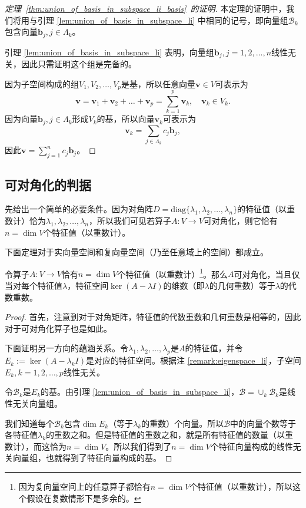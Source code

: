 \begin{proof}[定理~\ref{thm:union_of_basis_in_subspace_li_basis}~的证明]
    本定理的证明中，我们将用与引理 \ref{lem:union_of_basis_in_subspace_li} 中相同的记号，即向量组$\mathcal{B}_k$包含向量$\mathbf{b}_{j},j\in\Lambda_{k}$。

    引理 \ref{lem:union_of_basis_in_subspace_li} 表明，向量组$\mathbf{b}_{j},j=1,2,\dots,n$线性无关，因此只需证明这个组是完备的。

    因为子空间构成的组$V_1,V_2,\ldots,V_p$是基，所以任意向量$\mathbf{v}\in V$可表示为\[\mathbf{v}=\mathbf{v}_1+\mathbf{v}_2+\ldots+\mathbf{v}_p=\sum_{k=1}^p\mathbf{v}_k,\quad\mathbf{v}_k\in V_k.\]
    因为向量$\mathbf{b}_{j},j\in\Lambda_{k}$形成$V_k$的基，所以向量$\mathbf{v}_k$可表示为\[\mathbf{v}_k=\sum_{j\in\Lambda_k}c_j\mathbf{b}_j,\]
    因此$\mathbf{v}=\sum_{j=1}^nc_j\mathbf{b}_j$。
\end{proof}

\subsection{可对角化的判据}

先给出一个简单的必要条件。因为对角阵$D=\mathrm{diag}\{\lambda_{1},\lambda_{2},\ldots,\lambda_{n}\}$的特征值（以重数计）恰为$\lambda_1,\lambda_2,\dots,\lambda_n$，所以我们可见若算子$A:V\to V$可对角化，则它恰有$n=\dim V$个特征值（以重数计）。

下面定理对于实向量空间和复向量空间（乃至任意域上的空间）都成立。

\begin{theorem}\label{thm:algebraic_eq_geometric}
    令算子$A:V\to V$恰有$n=\dim V$个特征值（以重数计）\footnote{因为复向量空间上的任意算子都恰有$n=\dim V$个特征值（以重数计），所以这个假设在复数情形下是多余的。}。那么$A$可对角化，当且仅当对每个特征值$\lambda$，特征空间$\ker(A-\lambda I)$的维数（即$\lambda$的几何重数）等于$\lambda$的代数重数。
\end{theorem}
\begin{proof}
    首先，注意到对于对角矩阵，特征值的代数重数和几何重数是相等的，因此对于可对角化算子也是如此。

    下面证明另一方向的蕴涵关系。令$\lambda_1,\lambda_2,\ldots,\lambda_p$是$A$的特征值，并令$E_{k}:=\ker (A-\lambda_{k}I)$是对应的特征空间。根据注 \ref{remark:eigenspace_li}，子空间$E_k,k=1,2,\dots,p$线性无关。

    令$\mathcal{B}_k$是$E_k$的基。由引理 \ref{lem:union_of_basis_in_subspace_li}，$\mathcal{B}=\cup_k\mathcal{B}_k$是线性无关向量组。

    我们知道每个$\mathcal{B}_k$包含$\dim E_k$（等于$\lambda_k$的重数）个向量。所以$\mathcal{B}$中的向量个数等于各特征值$\lambda_k$的重数之和。但是特征值的重数之和，就是所有特征值的数量（以重数计），而这恰为$n=\dim V$。所以我们得到了$n=\dim V$个特征向量构成的线性无关向量组，也就得到了特征向量构成的基。
\end{proof}

